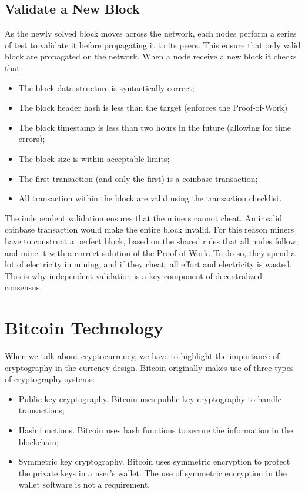 \documentclass{article}
\begin{document}
\subsection*{Validate a New Block}
As the newly solved block moves across the network, each nodes perform a series of test to validate it before propagating it to its peers. This ensure that only valid block are propagated on the network. When a node receive a new block it checks that:
\begin{itemize}
    \item The block data structure is syntactically correct;
    \item The block header hash is less than the target (enforces the Proof-of-Work)
    \item The block timestamp is less than two hours in the future (allowing for
time errors);
    \item The block size is within acceptable limits;
    \item The first transaction (and only the first) is a coinbase transaction;
    \item All transaction within the block are valid using the transaction checklist.
\end{itemize}
The independent validation ensures that the miners cannot cheat. An invalid coinbase transaction would make the entire block invalid. For this reason miners have to construct a perfect block, based on the shared rules that all nodes follow, and mine it with a correct solution of the Proof-of-Work.\newline
To do so, they spend a lot of electricity in mining, and if they cheat, all effort and electricity is wasted. This is why independent validation is a key component of decentralized consensus.
\clearpage

\section*{Bitcoin Technology}
When we talk about cryptocurrency, we have to highlight the importance of cryptography in the currency design.\newline
Bitcoin originally makes use of three types of cryptography systems:
\begin{itemize}
    \item Public key cryptography. Bitcoin uses public key cryptography to handle transactions;
    \item Hash functions. Bitcoin uses hash functions to secure the information in the blockchain;
    \item Symmetric key cryptography. Bitcoin uses symmetric encryption to protect the private keys in a user’s wallet. The use of symmetric encryption in the wallet software is not a requirement.
\end{itemize}
\end{document}
